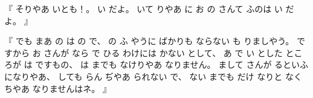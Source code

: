 %
『
そりやあ
いとも！。
%
い
だよ。
%
いて
りやあ
に
お
の
さんて
ふのは
い
だよ。
』

%
『
でも
まあ
の
は
の
で、
%
の
ふ
やうに
ばかりも
ならない
も
りましやう。
%
ですから
お
さんが
なら
で
%
ひる
わけには
かない
として、
%
あ
で
い
とした
ところが
は
ですもの、
%
は
までも
なけりやあ
なりません。
%
まして
さんが
るといふ
になりやあ、
%
しても
らん
ぢやあ
られない
で、
%
ない
までも
だけ
なりと
なくちやあ
なりませんはネ。
』
